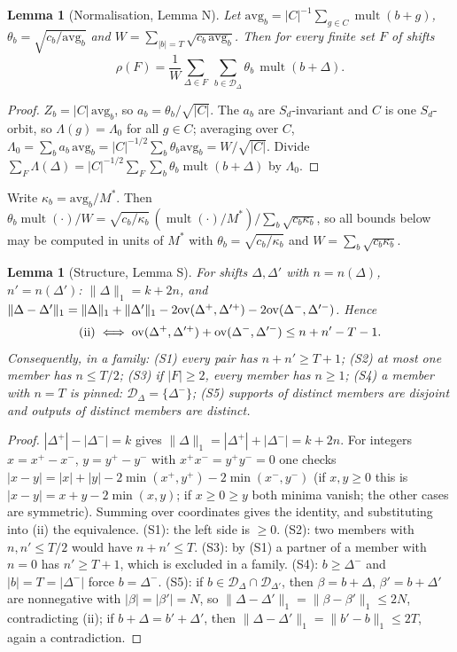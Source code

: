 \documentclass[11pt]{article}
\newcommand{\mult}{\operatorname{mult}}
\newtheorem{lemma}[theorem]{Lemma}
\theoremstyle{definition}
\theoremstyle{remark}
\begin{document}
\begin{lemma}[Normalisation, Lemma N]\label{lem:N}
Let $\mathrm{avg}_b=|C|^{-1}\sum_{g\in C}\mult(b+g)$, $\theta_b=\sqrt{c_b/\mathrm{avg}_b}$ and $W=\sum_{|b|=T}\sqrt{c_b\,\mathrm{avg}_b}$. Then for
every finite set $F$ of shifts
\[
\rho(F)=\frac1W\sum_{\Delta\in F}\ \sum_{b\in\mathcal D_\Delta}\theta_b\,\mult(b+\Delta).
\]
\end{lemma}
\begin{proof}
$Z_b=|C|\,\mathrm{avg}_b$, so $a_b=\theta_b/\sqrt{|C|}$. The $a_b$ are $S_d$-invariant and $C$ is one $S_d$-orbit, so $\Lambda(g)=\Lambda_0$ for
all $g\in C$; averaging over $C$, $\Lambda_0=\sum_ba_b\,\mathrm{avg}_b=|C|^{-1/2}\sum_b\theta_b\mathrm{avg}_b=W/\sqrt{|C|}$. Divide
$\sum_F\Lambda(\Delta)=|C|^{-1/2}\sum_F\sum_{b}\theta_b\mult(b+\Delta)$ by $\Lambda_0$.
\end{proof}
Write $\kappa_b=\mathrm{avg}_b/M^\ast$. Then $\theta_b\mult(\cdot)/W=\sqrt{c_b/\kappa_b}\,(\mult(\cdot)/M^\ast)\big/\sum_b\sqrt{c_b\kappa_b}$, so all
bounds below may be computed in units of $M^\ast$ with $\theta_b=\sqrt{c_b/\kappa_b}$ and $W=\sum_b\sqrt{c_b\kappa_b}$.

\begin{lemma}[Structure, Lemma S]\label{lem:S}
For shifts $\Delta,\Delta'$ with $n=n(\Delta)$, $n'=n(\Delta')$: $\lVert\Delta\rVert_1=k+2n$, and
$\lVert\Delta-\Delta'\rVert_1=\lVert\Delta\rVert_1+\lVert\Delta'\rVert_1-2\mathrm{ov}(\Delta^+,\Delta'^+)-2\mathrm{ov}(\Delta^-,\Delta'^-)$. Hence
\[
\text{(ii)}\iff\mathrm{ov}(\Delta^+,\Delta'^+)+\mathrm{ov}(\Delta^-,\Delta'^-)\le n+n'-T-1 .
\]
Consequently, in a family: (S1) every pair has $n+n'\ge T+1$; (S2) at most one member has $n\le T/2$; (S3) if $|F|\ge2$, every member has
$n\ge1$; (S4) a member with $n=T$ is \emph{pinned}: $\mathcal D_\Delta=\{\Delta^-\}$; (S5) supports of distinct members are disjoint and
outputs of distinct members are distinct.
\end{lemma}
\begin{proof}
$|\Delta^+|-|\Delta^-|=k$ gives $\lVert\Delta\rVert_1=|\Delta^+|+|\Delta^-|=k+2n$. For integers $x=x^+-x^-$, $y=y^+-y^-$ with
$x^+x^-=y^+y^-=0$ one checks $|x-y|=|x|+|y|-2\min(x^+,y^+)-2\min(x^-,y^-)$ (if $x,y\ge0$ this is $|x-y|=x+y-2\min(x,y)$; if $x\ge0\ge y$
both minima vanish; the other cases are symmetric). Summing over coordinates gives the identity, and substituting into (ii) the
equivalence. (S1): the left side is $\ge0$. (S2): two members with $n,n'\le T/2$ would have $n+n'\le T$. (S3): by (S1) a partner of a
member with $n=0$ has $n'\ge T+1$, which is excluded in a family. (S4): $b\ge\Delta^-$ and $|b|=T=|\Delta^-|$ force $b=\Delta^-$. (S5): if
$b\in\mathcal D_\Delta\cap\mathcal D_{\Delta'}$, then $\beta=b+\Delta$, $\beta'=b+\Delta'$ are nonnegative with $|\beta|=|\beta'|=N$, so
$\lVert\Delta-\Delta'\rVert_1=\lVert\beta-\beta'\rVert_1\le2N$, contradicting (ii); if $b+\Delta=b'+\Delta'$, then
$\lVert\Delta-\Delta'\rVert_1=\lVert b'-b\rVert_1\le2T$, again a contradiction.
\end{proof}
\end{document}
